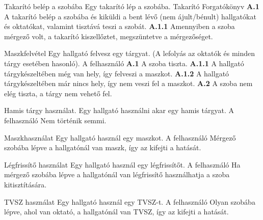 \begin{use-case}
    {Takarító belép a szobába}
    {Egy takarító lép a szobába.}
    {Takarító}
    Forgatókönyv \newline 
    \textbf{A.1} A takarító belép a szobába és kiküldi a bent lévő (nem ájult/bénult) hallgatókat és oktatókat, valamint tisztává teszi a szobát.\newline 
    \textbf{A.1.1} Amennyiben a szoba mérgező volt, a takarító kiszellőztet, megszüntetve a mérgezőséget.
\end{use-case}

\begin{use-case}
    {Maszkfelvétel}
    {Egy hallgató felvesz egy tárgyat. (A lefolyás az oktatók és minden tárgy esetében hasonló).}
    {A felhasználó}
    \textbf{A.1} A szoba tiszta. \newline
    \textbf{A.1.1} A hallgató tárgykészeltében még van hely, így felveszi a maszkot. \newline
    \textbf{A.1.2} A hallgató tárgykészeltében már nincs hely, így nem veszi fel a maszkot.  \newline   
     \textbf{A.2} A szoba nem elég tiszta, a tárgy nem vehető fel.
\end{use-case}

\begin{use-case}
    {Hamis tárgy használat.}
    {Egy hallgató használni akar egy hamis tárgyat.}
    {A felhasználó}
    Nem történik semmi.  
\end{use-case}

\begin{use-case}
    {Maszkhasználat}
    {Egy hallgató használ egy maszkot.}
    {A felhasználó}
    Mérgező szobába lépve a hallgatónál van maszk, így az kifejti a hatását.    
\end{use-case}

\begin{use-case}
    {Légfrissítő használat}
    {Egy hallgató használ egy légfrissítőt.}
    {A felhasználó}
    Ha mérgező szobába lépve a hallgatónál van légfrissítő használhatja a szoba kitisztítására. 
\end{use-case}

\begin{use-case}
    {TVSZ használat}
    {Egy hallgató használ egy TVSZ-t.}
    {A felhasználó}
    Olyan szobába lépve, ahol van oktató, a hallgatónál van TVSZ, így az kifejti a hatását.    
\end{use-case}

